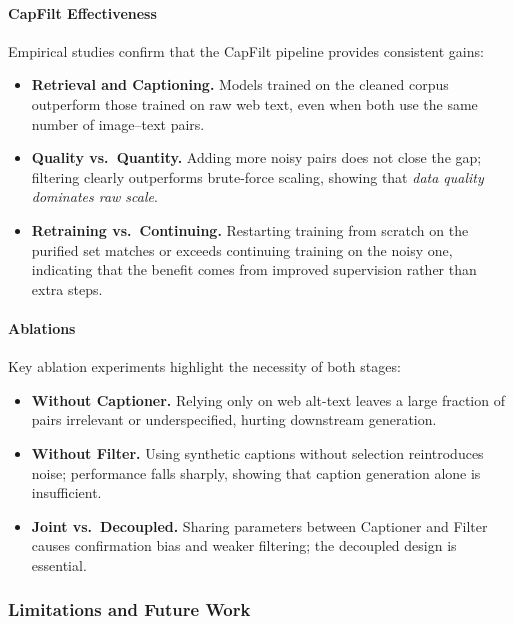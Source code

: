 \begin{enrichment}
\begin{enrichment}
        \paragraph{CapFilt Effectiveness}  
        Empirical studies confirm that the CapFilt pipeline provides consistent gains:
        \begin{itemize}
            \item \textbf{Retrieval and Captioning.} Models trained on the cleaned corpus outperform those trained on raw web text, even when both use the same number of image–text pairs.
            \item \textbf{Quality vs.\ Quantity.} Adding more noisy pairs does not close the gap; filtering clearly outperforms brute-force scaling, showing that \emph{data quality dominates raw scale}.
            \item \textbf{Retraining vs.\ Continuing.} Restarting training from scratch on the purified set matches or exceeds continuing training on the noisy one, indicating that the benefit comes from improved supervision rather than extra steps.
        \end{itemize}
        
        \paragraph{Ablations}  
        Key ablation experiments highlight the necessity of both stages:
        \begin{itemize}
            \item \textbf{Without Captioner.} Relying only on web alt-text leaves a large fraction of pairs irrelevant or underspecified, hurting downstream generation.
            \item \textbf{Without Filter.} Using synthetic captions without selection reintroduces noise; performance falls sharply, showing that caption generation alone is insufficient.
            \item \textbf{Joint vs.\ Decoupled.} Sharing parameters between Captioner and Filter causes confirmation bias and weaker filtering; the decoupled design is essential.
        \end{itemize}
        
        \subsubsection{Limitations and Future Work}
        

\end{enrichment}
\end{enrichment}
